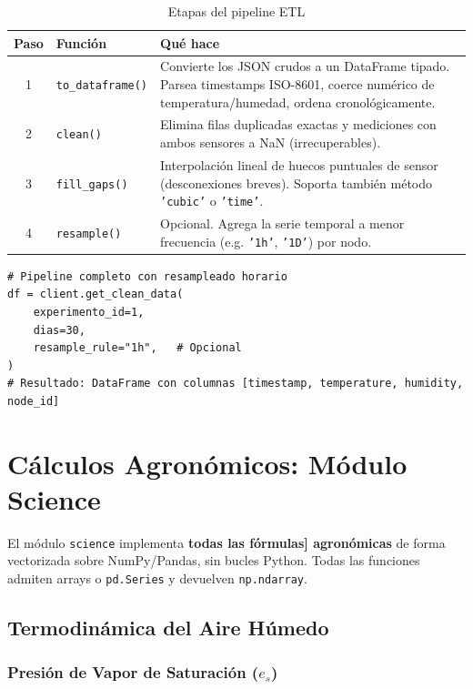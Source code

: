 \begin{table}[H]
    \centering
    \caption{Etapas del pipeline ETL}
    \begin{tabularx}{\textwidth}{clX}
        \toprule
        \textbf{Paso} & \textbf{Función}   & \textbf{Qué hace} \\
        \midrule
        1 & \texttt{to\_dataframe()} & Convierte los JSON crudos a un DataFrame tipado. Parsea timestamps ISO-8601, coerce numérico de temperatura/humedad, ordena cronológicamente. \\
        2 & \texttt{clean()}         & Elimina filas duplicadas exactas y mediciones con ambos sensores a NaN (irrecuperables). \\
        3 & \texttt{fill\_gaps()}    & Interpolación lineal de huecos puntuales de sensor (desconexiones breves). Soporta también método \texttt{'cubic'} o \texttt{'time'}. \\
        4 & \texttt{resample()}      & Opcional. Agrega la serie temporal a menor frecuencia (e.g. \texttt{'1h'}, \texttt{'1D'}) por nodo. \\
        \bottomrule
    \end{tabularx}
\end{table}

\begin{lstlisting}[style=trama, caption={Uso del pipeline ETL}]
# Pipeline completo con resampleado horario
df = client.get_clean_data(
    experimento_id=1,
    dias=30,
    resample_rule="1h",   # Opcional
)
# Resultado: DataFrame con columnas [timestamp, temperature, humidity, node_id]
\end{lstlisting}

\section{Cálculos Agronómicos: Módulo Science}

El módulo \texttt{science} implementa \textbf{todas las fórmulas] agronómicas} de forma
vectorizada sobre NumPy/Pandas, sin bucles Python. Todas las funciones admiten arrays o
\texttt{pd.Series} y devuelven \texttt{np.ndarray}.

\subsection{Termodinámica del Aire Húmedo}

\subsubsection{Presión de Vapor de Saturación ($e_s$)}

